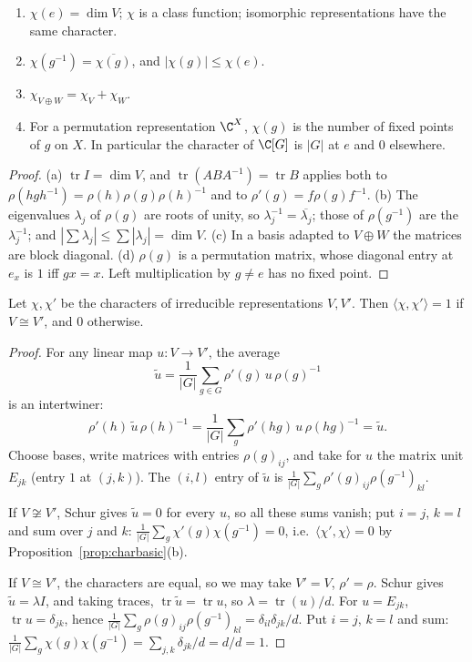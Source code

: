 \begin{proposition}\label{prop:charbasic}
\begin{enumerate}[label=(\alph*)]
\item $\chi(e)=\dim V$; $\chi$ is a class function; isomorphic representations have the same character.
\item $\chi(g^{-1})=\overline{\chi(g)}$, and $|\chi(g)|\le\chi(e)$.
\item $\chi_{V\oplus W}=\chi_V+\chi_W$.
\item For a permutation representation $\C^X$, $\chi(g)$ is the number of fixed points of $g$ on $X$. In particular the character of $\C[G]$ is $|G|$ at $e$ and $0$ elsewhere.
\end{enumerate}
\end{proposition}
\begin{proof}
(a) $\operatorname{tr}I=\dim V$, and $\operatorname{tr}(ABA^{-1})=\operatorname{tr}B$ applies both to $\rho(hgh^{-1})=\rho(h)\rho(g)\rho(h)^{-1}$ and to $\rho'(g)=f\rho(g)f^{-1}$. (b) The eigenvalues $\lambda_j$ of $\rho(g)$ are roots of unity, so $\lambda_j^{-1}=\overline{\lambda_j}$; those of $\rho(g^{-1})$ are the $\lambda_j^{-1}$; and $|\sum\lambda_j|\le\sum|\lambda_j|=\dim V$. (c) In a basis adapted to $V\oplus W$ the matrices are block diagonal. (d) $\rho(g)$ is a permutation matrix, whose diagonal entry at $e_x$ is $1$ iff $gx=x$. Left multiplication by $g\ne e$ has no fixed point.
\end{proof}

\begin{theorem}\label{thm:orth}
Let $\chi,\chi'$ be the characters of irreducible representations $V,V'$. Then $\langle\chi,\chi'\rangle=1$ if $V\cong V'$, and $0$ otherwise.
\end{theorem}
\begin{proof}
For any linear map $u:V\to V'$, the average
\[
\tilde u=\frac1{|G|}\sum_{g\in G}\rho'(g)\,u\,\rho(g)^{-1}
\]
is an intertwiner:
\[
\rho'(h)\,\tilde u\,\rho(h)^{-1}=\frac1{|G|}\sum_g\rho'(hg)\,u\,\rho(hg)^{-1}=\tilde u.
\]
 Choose bases, write matrices with entries $\rho(g)_{ij}$, and take for $u$ the matrix unit $E_{jk}$ (entry $1$ at $(j,k)$). The $(i,l)$ entry of $\tilde u$ is $\frac1{|G|}\sum_g\rho'(g)_{ij}\rho(g^{-1})_{kl}$.

If $V\not\cong V'$, Schur gives $\tilde u=0$ for every $u$, so all these sums vanish; put $i=j$, $k=l$ and sum over $j$ and $k$: $\frac1{|G|}\sum_g\chi'(g)\chi(g^{-1})=0$, i.e.\ $\langle\chi',\chi\rangle=0$ by Proposition~\ref{prop:charbasic}(b).

If $V\cong V'$, the characters are equal, so we may take $V'=V$, $\rho'=\rho$. Schur gives $\tilde u=\lambda I$, and taking traces, $\operatorname{tr}\tilde u=\operatorname{tr}u$, so $\lambda=\operatorname{tr}(u)/d$. For $u=E_{jk}$, $\operatorname{tr}u=\delta_{jk}$, hence $\frac1{|G|}\sum_g\rho(g)_{ij}\rho(g^{-1})_{kl}=\delta_{il}\delta_{jk}/d$. Put $i=j$, $k=l$ and sum: $\frac1{|G|}\sum_g\chi(g)\chi(g^{-1})=\sum_{j,k}\delta_{jk}/d=d/d=1$.
\end{proof}

